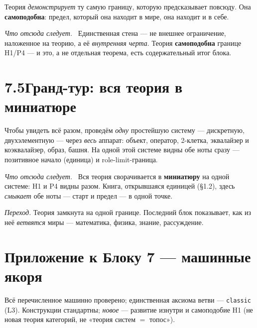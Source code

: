 \documentclass[12pt,a4paper]{article}
\newcommand{\rezultat}{\medskip\noindent\emph{Что отсюда следует.}\ }
\begin{document}
Теория \emph{демонстрирует} ту самую границу, которую предсказывает повсюду. Она \textbf{самоподобна}:
предел, который она находит в мире, она находит и в себе.

\rezultat
Единственная стена --- не внешнее ограничение, наложенное на теорию, а её \emph{внутренняя черта}.
Теория \textbf{самоподобна} границе H1/P4 --- и это, а не отдельная теорема, есть содержательный итог
блока.

\section*{7.5\quad Гранд-тур: вся теория в миниатюре}

Чтобы увидеть всё разом, проведём \emph{одну} простейшую систему --- дискретную, двухэлементную ---
через \emph{весь} аппарат: объект, оператор, 2-клетка, эквалайзер и коэквалайзер, образ, башня. На
одной этой системе видны обе ноты сразу --- позитивное начало (единица) и role-limit-граница.

\rezultat
Вся теория сворачивается в \textbf{миниатюру} на одной системе: H1 и P4 видны разом. Книга,
открывшаяся единицей (§1.2), здесь \emph{смыкает} обе ноты --- старт и предел --- в одной точке.

\medskip
\noindent\emph{Переход.} Теория замкнута на одной границе. Последний блок показывает, как из неё
\emph{ветвятся} миры --- математика, физика, знание, рассуждение.

\appendix
\section*{Приложение к Блоку 7 — машинные якоря}
\small\raggedright\sloppy
\noindent Всё перечисленное машинно проверено; единственная аксиома ветви --- \texttt{classic} (L3).
Конструкции стандартны; \emph{новое} --- развитие изнутри и самоподобие H1 (не новая теория категорий,
не «теория систем $=$ топос»).
\end{document}
